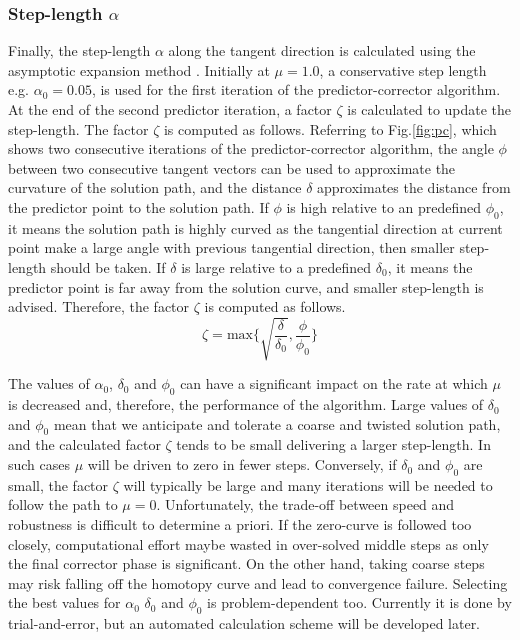 \documentclass{article}
\theoremstyle{definition}
\begin{document}
\subsubsection{Step-length $\alpha$}
Finally, the step-length $\alpha$ along the tangent direction is calculated using the asymptotic expansion method \cite{Brown_2016, allgower3}. Initially at $\mu = 1.0$, a conservative step length e.g. $\alpha_0 = 0.05$, is used for the first iteration of the predictor-corrector algorithm. At the end of the second predictor iteration, a factor $\zeta$ is calculated to update the step-length. The factor $\zeta$ is computed as follows.  Referring to Fig.\ref{fig:pc}, which shows two consecutive iterations of the predictor-corrector algorithm, the angle $\phi$ between two consecutive tangent vectors can be used to approximate the curvature of the solution path, and the distance $\delta$ approximates the distance from the predictor point to the solution path. 
If $\phi$ is high relative to an predefined $\phi_0$, it means the solution path is highly curved as the tangential direction at current point make a large angle with previous tangential direction, then smaller step-length should be taken. If $\delta$ is large relative to a predefined $\delta_0$, it means the predictor point is far away from the solution curve, and smaller step-length is advised. Therefore, the factor $\zeta$ is computed as follows. 
\begin{equation}\label{eq:faclen}
\zeta = \textrm{max} \{ \sqrt{\frac{\delta}{\delta_0} }, \frac{\phi}{\phi_0}  \}  
\end{equation}

The values of $\alpha_0$, $\delta_0$ and $\phi_0$ can have a significant impact on the rate at which $\mu$ is decreased and, therefore, the performance of the algorithm. Large values of $\delta_0$ and $\phi_0$ mean that we anticipate and tolerate a coarse and twisted solution path, and the calculated factor $\zeta$ tends to be small delivering a larger step-length. In such cases $\mu$ will be driven to zero in fewer steps.  Conversely, if $\delta_0$ and $\phi_0$ are small, the factor $\zeta$ will typically be large and many iterations will be needed to follow the path to $\mu = 0$. Unfortunately, the trade-off between speed and robustness is difficult to determine a priori. If the zero-curve is followed too closely, computational effort maybe wasted in over-solved middle steps as only the final corrector phase is significant. On the other hand, taking coarse steps may risk falling off the homotopy curve and lead to convergence failure. Selecting the best values for $\alpha_0$ $\delta_0$ and $\phi_0$ is problem-dependent too. Currently it is done by trial-and-error, but an automated calculation scheme will be developed later.
\end{document}
